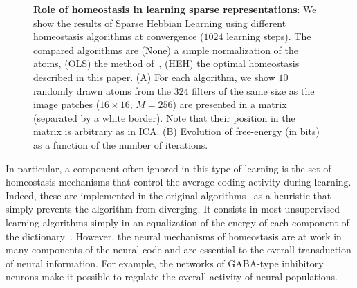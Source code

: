 \documentclass[a4paper, 11pt, draft]{article} %
\begin{document}
\begin{figure}%
\caption{
{\bf Role of homeostasis in learning sparse representations}: 
We show the results of Sparse Hebbian Learning using different homeostasis algorithms at convergence ($1024$ learning steps). The compared algorithms are {\sf (None)} a simple normalization of the atoms, {\sf (OLS)} the method of~\citep{Olshausen97}, {\sf (HEH)} the optimal homeostasis described in this paper. {\sf (A)} For each algorithm, we show $10$ randomly drawn atoms from the $324$ filters of the same size as the image patches ($16 \times 16$, $M=256$) are presented in a matrix (separated by a white border). Note that their position in the matrix is arbitrary as in ICA. {\sf (B)} Evolution of free-energy (in bits) as a function of the number of iterations. %
\label{fig:map}}%
\end{figure}%
In particular, a component often ignored in this type of learning is the set of homeostasis mechanisms that control the average coding activity during learning. Indeed, these are implemented in the original algorithms~\citep{Olshausen97} as a heuristic that simply prevents the algorithm from diverging. It consists in most unsupervised learning algorithms simply in an equalization of the energy of each component of the dictionary~\citep{Mairal11}. However, the neural mechanisms of homeostasis are at work in many components of the neural code and are essential to the overall transduction of neural information. For example, the networks of GABA-type inhibitory neurons make it possible to regulate the overall activity of neural populations. %
\end{document}
